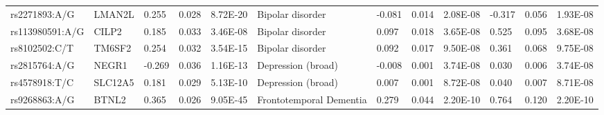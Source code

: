 \begin{table}[]
{\begin{tabular}{llllllllllll}
		\rowcolor[HTML]{E0E0E0}rs2271893:A/G                    & LMAN2L                            & 0.255                             & 0.028                           & 8.72E-20                       & Bipolar disorder                           & -0.081                            & 0.014                           & 2.08E-08                       & -0.317                          & 0.056                           & 1.93E-08                       \\
		\rowcolor[HTML]{E0E0E0}rs113980591:A/G                  & CILP2                             & 0.185                             & 0.033                           & 3.46E-08                       & Bipolar disorder                           & 0.097                             & 0.018                           & 3.65E-08                       & 0.525                           & 0.095                           & 3.68E-08                       \\
		\rowcolor[HTML]{E0E0E0}rs8102502:C/T                    & TM6SF2                            & 0.254                             & 0.032                           & 3.54E-15                       & Bipolar disorder                           & 0.092                             & 0.017                           & 9.50E-08                       & 0.361                           & 0.068                           & 9.75E-08                       \\
		\rowcolor[HTML]{BEBEBE}rs2815764:A/G                    & NEGR1                             & -0.269                            & 0.036                           & 1.16E-13                       & Depression (broad)                         & -0.008                            & 0.001                           & 3.74E-08                       & 0.030                           & 0.006                           & 3.74E-08                       \\
		\rowcolor[HTML]{BEBEBE}rs4578918:T/C                    & SLC12A5                           & 0.181                             & 0.029                           & 5.13E-10                       & Depression (broad)                         & 0.007                             & 0.001                           & 8.72E-08                       & 0.040                           & 0.007                           & 8.71E-08                       \\
		\rowcolor[HTML]{E0E0E0}rs9268863:A/G                    & BTNL2                             & 0.365                             & 0.026                           & 9.05E-45                       & Frontotemporal Dementia                    & 0.279                             & 0.044                           & 2.20E-10                       & 0.764                           & 0.120                           & 2.20E-10                       \\

\end{tabular}}
\end{table}
